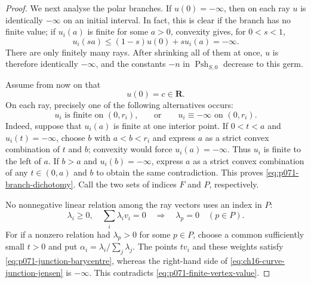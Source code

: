 \begin{proof}
We next analyse the polar branches.  If $u(0)=-\infty$, then on each ray
$u$ is identically $-\infty$ on an initial interval.  In fact, this is
clear if the branch has no finite value; if $u_i(a)$ is finite for some
$a>0$, convexity gives, for $0<s<1$,
\[
                    u_i(sa)
                    \leq(1-s)u(0)+s u_i(a)=-\infty.
\]
There are only finitely many rays.  After shrinking all of them at once,
$u$ is therefore identically $-\infty$, and the constants $-n$ in
$\operatorname{Psh}_{S,0}$ decrease to this germ.

Assume from now on that
\begin{equation}
\label{eq:p071-finite-vertex-value}
                              u(0)=c\in\mathbf R.
\end{equation}
On each ray, precisely one of the following alternatives occurs:
\begin{equation}
\label{eq:p071-branch-dichotomy}
 \text{$u_i$ is finite on $(0,r_i)$,}
 \qquad\text{or}\qquad
 \text{$u_i\equiv-\infty$ on $(0,r_i)$.}
\end{equation}
Indeed, suppose that $u_i(a)$ is finite at one interior point.  If
$0<t<a$ and $u_i(t)=-\infty$, choose $b$ with $a<b<r_i$ and express $a$
as a strict convex combination of $t$ and $b$; convexity would force
$u_i(a)=-\infty$.  Thus $u_i$ is finite to the left of $a$.  If $b>a$
and $u_i(b)=-\infty$, express $a$ as a strict convex combination of any
$t\in(0,a)$ and $b$ to obtain the same contradiction.  This proves
\eqref{eq:p071-branch-dichotomy}.  Call the two sets of indices $F$ and
$P$, respectively.

No nonnegative linear relation among the ray vectors uses an index in
$P$:
\begin{equation}
\label{eq:p071-polar-relation-exclusion}
 \lambda_i\geq0,\quad \sum_i\lambda_i v_i=0
 \quad\Longrightarrow\quad
 \lambda_p=0\quad(p\in P).
\end{equation}
For if a nonzero relation had $\lambda_p>0$ for some $p\in P$, choose a
common sufficiently small $t>0$ and put
$\alpha_i=\lambda_i/\sum_j\lambda_j$.  The points $t v_i$ and these
weights satisfy \eqref{eq:p071-junction-barycentre}, whereas the
right-hand side of \eqref{eq:ch16-curve-junction-jensen} is $-\infty$.  This
contradicts \eqref{eq:p071-finite-vertex-value}.


\end{proof}
